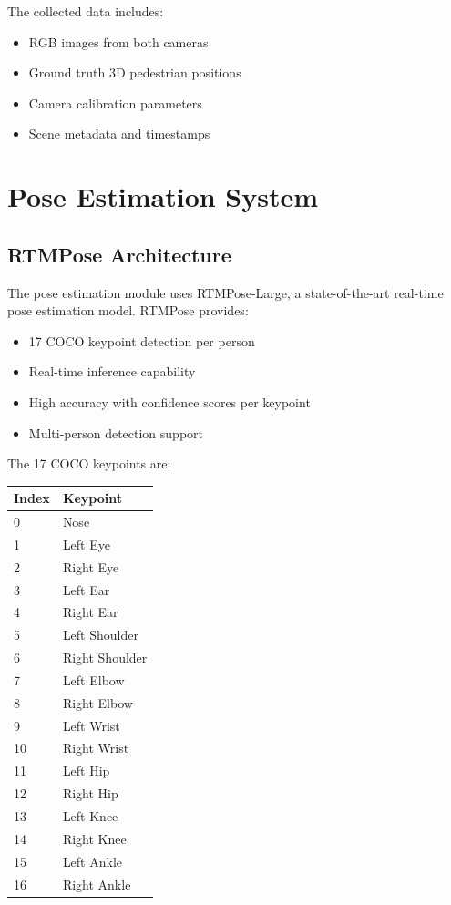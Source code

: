 \documentclass[11pt,a4paper]{article}
\begin{document}
The collected data includes:
\begin{itemize}
    \item RGB images from both cameras
    \item Ground truth 3D pedestrian positions
    \item Camera calibration parameters
    \item Scene metadata and timestamps
\end{itemize}

\section{Pose Estimation System}

\subsection{RTMPose Architecture}

The pose estimation module uses RTMPose-Large, a state-of-the-art real-time pose estimation model. RTMPose provides:

\begin{itemize}
    \item 17 COCO keypoint detection per person
    \item Real-time inference capability
    \item High accuracy with confidence scores per keypoint
    \item Multi-person detection support
\end{itemize}

The 17 COCO keypoints are:
\begin{center}
\begin{tabular}{ll}
\toprule
\textbf{Index} & \textbf{Keypoint} \\
\midrule
0 & Nose \\
1 & Left Eye \\
2 & Right Eye \\
3 & Left Ear \\
4 & Right Ear \\
5 & Left Shoulder \\
6 & Right Shoulder \\
7 & Left Elbow \\
8 & Right Elbow \\
9 & Left Wrist \\
10 & Right Wrist \\
11 & Left Hip \\
12 & Right Hip \\
13 & Left Knee \\
14 & Right Knee \\
15 & Left Ankle \\
16 & Right Ankle \\
\bottomrule
\end{tabular}
\end{center}
\end{document}

